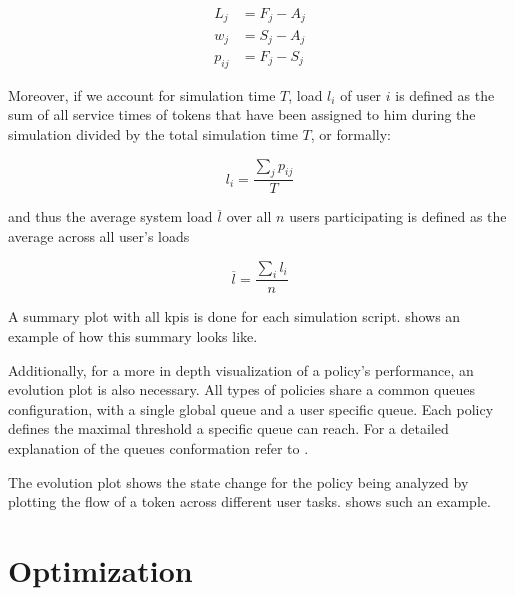 \documentclass{seal_thesis}
\begin{document}
\begin{align}
	L_j&=F_j-A_j \label{eq:lateness}\\
	w_j&=S_j-A_j \\
	p_{ij}&=F_j-S_j
\end{align}

Moreover, if we account for simulation time $T$, load $l_i$ of user $i$ is defined as the sum of all service times of tokens that have been assigned to him during the simulation divided by the total simulation time $T$, or formally:

\begin{equation}
	l_i=\frac{\sum_j p_{ij}}{T}
\end{equation}

and thus the average system load $\overline{l}$ over all $n$ users participating is defined as the average across all user's loads \ie

\begin{equation}
	\overline{l} = \frac{\sum_i l_i}{n}
\end{equation}

A summary plot with all \glspl{kpi} is done for each simulation script.  shows an example of how this summary looks like.


Additionally, for a more in depth visualization of a policy's performance, an evolution plot is also necessary. All types of policies share a common queues configuration, with a single global queue and a user specific queue. Each policy defines the maximal threshold a specific queue can reach. For a detailed explanation of the queues conformation refer to .

The evolution plot shows the state change for the policy being analyzed by plotting the flow of a token across different user tasks.  shows such an example.


\clearpage

\section{Optimization}
\label{sec:op_results}
\end{document}
